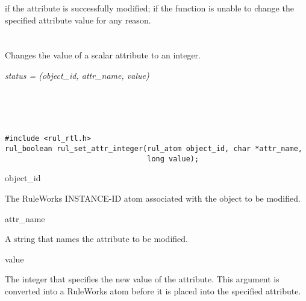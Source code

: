  if the attribute is successfully modified;  if the
function is unable to change the specified attribute value for any
reason.

\begin{seealso}




\end{seealso}

\section*{}

Changes the value of a scalar attribute to an integer.

\Syntax

\it{status} = (\it{object\_id},
\it{attr\_name}, \it{value})

\begin{args}
   \\
   \\
   \\
\end{args}
        
\CBinding
\begin{verbatim}
#include <rul_rtl.h>
rul_boolean rul_set_attr_integer(rul_atom object_id, char *attr_name,
                                 long value);
\end{verbatim}

\begin{arguments}
\item[object\_id]

  The RuleWorks INSTANCE-ID atom associated with the object to be
  modified.

\item[attr\_name]

  A string that names the attribute to be modified.

\item[value]

  The integer that specifies the new value of the attribute. This
  argument is converted into a RuleWorks  atom before it is
  placed into the specified attribute.
\end{arguments}

